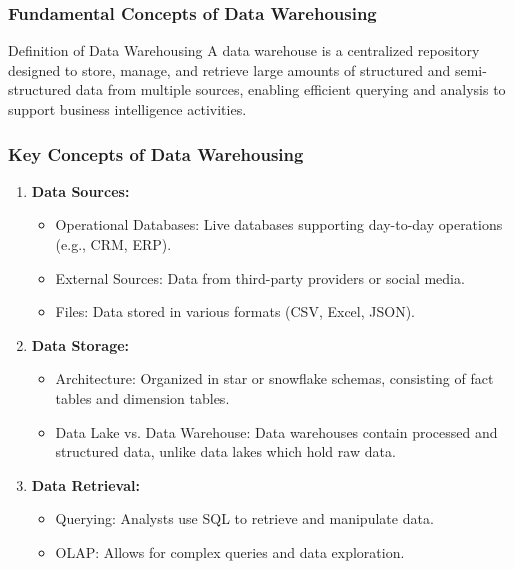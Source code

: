 \documentclass{beamer}
\begin{document}
\begin{frame}[fragile]
    \frametitle{Fundamental Concepts of Data Warehousing}

    \begin{block}{Definition of Data Warehousing}
        A data warehouse is a centralized repository designed to store, manage, and retrieve large amounts of structured and semi-structured data from multiple sources, enabling efficient querying and analysis to support business intelligence activities.
    \end{block}
\end{frame}

\begin{frame}[fragile]
    \frametitle{Key Concepts of Data Warehousing}

    \begin{enumerate}
        \item \textbf{Data Sources:}
        \begin{itemize}
            \item Operational Databases: Live databases supporting day-to-day operations (e.g., CRM, ERP).
            \item External Sources: Data from third-party providers or social media.
            \item Files: Data stored in various formats (CSV, Excel, JSON).
        \end{itemize}

        \item \textbf{Data Storage:}
        \begin{itemize}
            \item Architecture: Organized in star or snowflake schemas, consisting of fact tables and dimension tables.
            \item Data Lake vs. Data Warehouse: Data warehouses contain processed and structured data, unlike data lakes which hold raw data.
        \end{itemize}
        
        \item \textbf{Data Retrieval:}
        \begin{itemize}
            \item Querying: Analysts use SQL to retrieve and manipulate data.
            \item OLAP: Allows for complex queries and data exploration.
        \end{itemize}
    \end{enumerate}
\end{frame}
\end{document}
